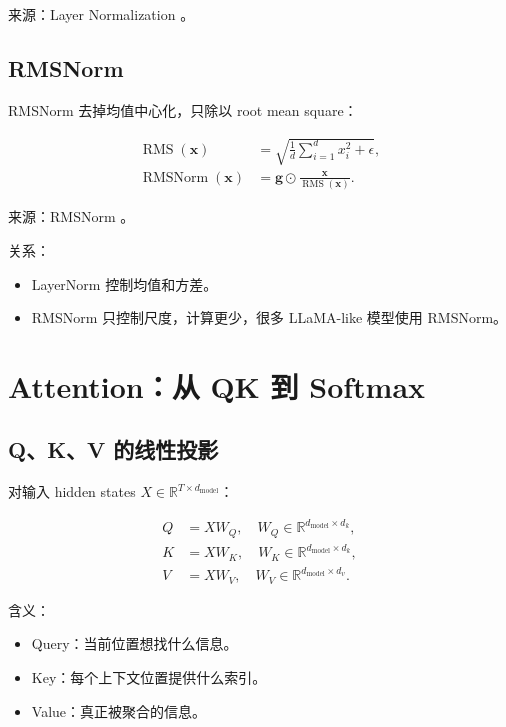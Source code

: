 \documentclass[UTF8,12pt]{ctexart}
\newcommand{\R}{\mathbb{R}}
\newcommand{\1}{\mathbf{1}}
\newcommand{\RMSNorm}{\operatorname{RMSNorm}}
\begin{document}
来源：Layer Normalization \cite{ba2016layernorm}。

\subsection{RMSNorm}

RMSNorm 去掉均值中心化，只除以 root mean square：

\begin{align}
\operatorname{RMS}(\bm{x})
&=\sqrt{\frac{1}{d}\sum_{i=1}^{d}x_i^2+\epsilon},\\
\RMSNorm(\bm{x})
&=\bm{g}\odot \frac{\bm{x}}{\operatorname{RMS}(\bm{x})}.
\label{eq:rmsnorm}
\end{align}

来源：RMSNorm \cite{zhang2019rmsnorm}。

关系：

\begin{itemize}
  \item LayerNorm 控制均值和方差。
  \item RMSNorm 只控制尺度，计算更少，很多 LLaMA-like 模型使用 RMSNorm。
\end{itemize}

\section{Attention：从 QK 到 Softmax}

\subsection{Q、K、V 的线性投影}

对输入 hidden states $X\in\R^{T\times d_{\mathrm{model}}}$：

\begin{align}
Q &= XW_Q,\quad W_Q\in\R^{d_{\mathrm{model}}\times d_k},\\
K &= XW_K,\quad W_K\in\R^{d_{\mathrm{model}}\times d_k},\\
V &= XW_V,\quad W_V\in\R^{d_{\mathrm{model}}\times d_v}.
\end{align}

含义：

\begin{itemize}
  \item Query：当前位置想找什么信息。
  \item Key：每个上下文位置提供什么索引。
  \item Value：真正被聚合的信息。
\end{itemize}
\end{document}
